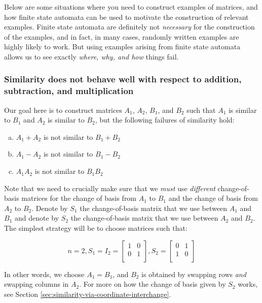 \documentclass[10pt]{amsart}
\begin{document}
Below are some situations where you need to construct examples of
matrices, and how finite state automata can be used to motivate the
construction of relevant examples. Finite state automata are
definitely not {\em necessary} for the construction of the examples,
and in fact, in many cases, randomly written examples are highly
likely to work. But using examples arising from finite state automata
allows us to see exactly {\em where, why, and how} things fail.

\subsubsection{Similarity does not behave well with respect to addition, subtraction, and multiplication}

Our goal here is to construct matrices $A_1$, $A_2$, $B_1$, and $B_2$
such that $A_1$ is similar to $B_1$ and $A_2$ is similar to $B_2$, but
the following failures of similarity hold:

\begin{enumerate}[(a)]
\item $A_1 + A_2$ is not similar to $B_1 + B_2$
\item $A_1 - A_2$ is not similar to $B_1 - B_2$
\item $A_1A_2$ is not similar to $B_1B_2$
\end{enumerate}

Note that we need to crucially make sure that we {\em must} use {\em
  different} change-of-basis matrices for the change of basis from
$A_1$ to $B_1$ and the change of basis from $A_2$ to $B_2$. Denote by
$S_1$ the change-of-basis matrix that we use between $A_1$ and $B_1$
and denote by $S_2$ the change-of-basis matrix that we use between
$A_2$ and $B_2$. The simplest strategy will be to choose matrices such
that:

$$n = 2, S_1 = I_2 = \left[\begin{matrix} 1 & 0 \\ 0 & 1 \\\end{matrix}\right], S_2 = \left[\begin{matrix} 0 & 1 \\ 1 & 0 \\\end{matrix}\right]$$

In other words, we choose $A_1 = B_1$, and $B_2$ is obtained by
swapping rows {\em and} swapping columns in $A_2$. For more on how the
change of basis given by $S_2$ works, see Section
\ref{sec:similarity-via-coordinate-interchange}.
\end{document}
